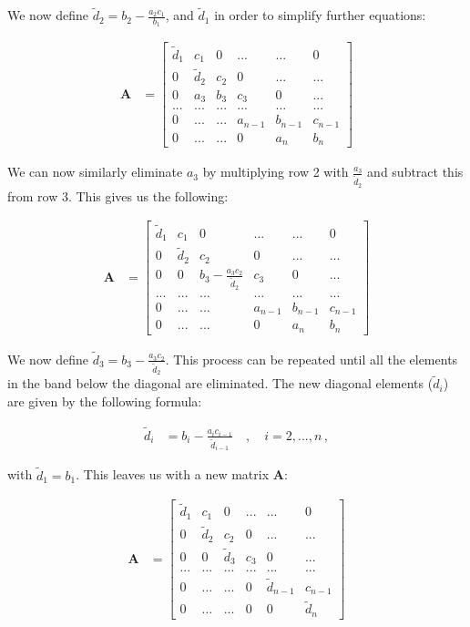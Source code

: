 \documentclass[english,notitlepage,reprint,nofootinbib]{revtex4-1}  %
\begin{document}
We now define $\tilde{d}_2 = b_2 - \frac{a_2c_1}{b_1}$, and $\tilde{d}_1$ in order to simplify further equations:

\begin{align*}
\textbf{A} &= \begin{bmatrix}
\tilde{d}_1 & c_1 & 0 & ... & ... & 0 \\
0 & \tilde{d}_2 & c_2 & 0 & ... & ... \\
0 & a_3 & b_3 & c_3 & 0 & ... \\
... & ... & ... & ... & ... & ... \\
0 & ... & ... & a_{n-1} & b_{n-1} & c_{n-1} \\
0 & ... & ... & 0 & a_{n} & b_n
\end{bmatrix}
\end{align*}

We can now similarly eliminate $a_3$ by multiplying row 2 with $\frac{a_3}{\tilde{d}_2}$ and subtract this from row 3. This gives us the following:

\begin{align*}
\textbf{A} &= \begin{bmatrix}
\tilde{d}_1 & c_1 & 0 & ... & ... & 0 \\
0 & \tilde{d}_2 & c_2 & 0 & ... & ... \\
0 & 0 & b_3 - \frac{a_3 c_2}{\tilde{d}_2} & c_3 & 0 & ... \\
... & ... & ... & ... & ... & ... \\
0 & ... & ... & a_{n-1} & b_{n-1} & c_{n-1} \\
0 & ... & ... & 0 & a_{n} & b_n
\end{bmatrix}
\end{align*}

We now define $\tilde{d}_3 = b_3 - \frac{a_3c_2}{\tilde{d}_2}$. This process can be repeated until all the elements in the band below the diagonal are eliminated. The new diagonal elements ($\tilde{d}_i$) are given by the following formula:

\begin{align*}
\tilde{d}_i &= b_i - \frac{a_i c_{i-1}}{\tilde{d}_{i-1}} \quad , \quad i = 2,...,n \, ,
\end{align*}

with $\tilde{d}_1 = b_1$. This leaves us with a new matrix \textbf{A}:

\begin{align*}
\textbf{A} &= \begin{bmatrix}
\tilde{d}_1 & c_1 & 0 & ... & ... & 0 \\
0 & \tilde{d}_2 & c_2 & 0 & ... & ... \\
0 & 0 & \tilde{d}_3 & c_3 & 0 & ... \\
... & ... & ... & ... & ... & ... \\
0 & ... & ... & 0 & \tilde{d}_{n-1} & c_{n-1} \\
0 & ... & ... & 0 & 0 & \tilde{d}_n
\end{bmatrix}
\end{align*}
\end{document}
